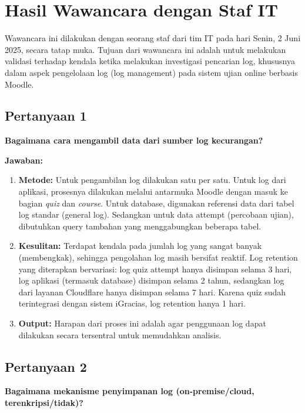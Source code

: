 \chapter{Hasil Wawancara dengan Staf IT}\label{app:appendix_A}

Wawancara ini dilakukan dengan seorang staf dari tim IT pada hari Senin, 2 Juni 2025, secara tatap muka. Tujuan dari wawancara ini adalah untuk melakukan validasi terhadap kendala ketika melakukan investigasi pencarian log, khususnya dalam aspek pengelolaan log (log management) pada sistem ujian online berbasis Moodle.

\section*{Pertanyaan 1}
\textbf{Bagaimana cara mengambil data dari sumber log kecurangan?}

\vspace{0.3cm}
\textbf{Jawaban:}
\begin{enumerate}
    \item \textbf{Metode:} Untuk pengambilan log dilakukan satu per satu. Untuk log dari aplikasi, prosesnya dilakukan melalui antarmuka Moodle dengan masuk ke bagian \textit{quiz} dan \textit{course}. Untuk database, digunakan referensi data dari tabel log standar (general log). Sedangkan untuk data attempt (percobaan ujian), dibutuhkan query tambahan yang menggabungkan beberapa tabel.
    
    \item \textbf{Kesulitan:} Terdapat kendala pada jumlah log yang sangat banyak (membengkak), sehingga pengolahan log masih bersifat reaktif. Log retention yang diterapkan bervariasi: log quiz attempt hanya disimpan selama 3 hari, log aplikasi (termasuk database) disimpan selama 2 tahun, sedangkan log dari layanan Cloudflare hanya disimpan selama 7 hari. Karena quiz sudah terintegrasi dengan sistem iGracias, log retention hanya 1 hari.
    
    \item \textbf{Output:} Harapan dari proses ini adalah agar penggunaan log dapat dilakukan secara tersentral untuk memudahkan analisis.
\end{enumerate}


\section*{Pertanyaan 2}
\textbf{Bagaimana mekanisme penyimpanan log (on-premise/cloud, terenkripsi/tidak)?}

